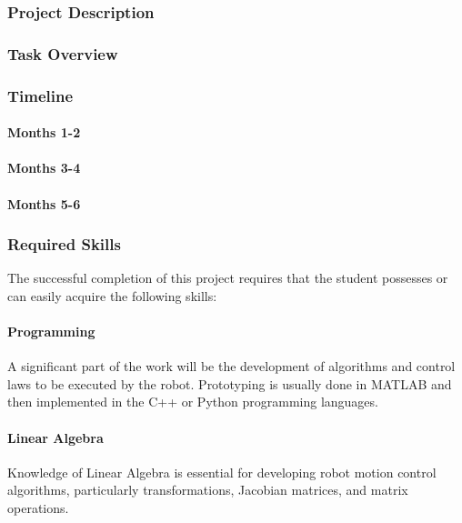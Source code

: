 
\subsubsection{Project Description}



\subsubsection{Task Overview}

\subsubsection{Timeline}
\paragraph{Months 1-2}

\paragraph{Months 3-4}

\paragraph{Months 5-6}

\subsubsection{Required Skills}
The successful completion of this project requires that the student possesses or can easily acquire the following skills: 
\paragraph{Programming} A significant part of the work will be the development of algorithms and control laws to be executed by the robot. Prototyping is usually done in MATLAB and then implemented in the C++ or Python programming languages.
\paragraph{Linear Algebra} Knowledge of Linear Algebra is essential for developing robot motion control algorithms, particularly  transformations, Jacobian matrices, and matrix operations.
